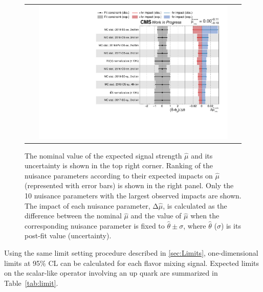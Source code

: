  \begin{figure}[tbh!]
 \begin{center}
 \begin{tabular}{c}
 \includegraphics[width=0.9\textwidth]{figures/Part4/Sensitivity/Impact}
 \end{tabular}
 \caption{The nominal value of the expected signal strength $\hat{\mu}$ and its uncertainty is shown in the top right corner. Ranking of the nuisance parameters according to their expected impacts on $\hat{\mu}$ (represented with error bars) is shown in the right panel. Only the 10 nuisance parameters with the largest observed impacts are shown. The impact of each nuisance parameter, $\mathrm{\Delta}\hat{\mu}$, is calculated as the difference between the nominal $\hat{\mu}$ and the value of $\hat{\mu}$ when the corresponding nuisance parameter is fixed to $\hat{\theta}\pm\sigma$, where $\hat{\theta}$ ($\sigma$) is its post-fit value (uncertainty).}
 \label{fig:Impact_2}
 \end{center}
 \end{figure}
 
Using the same limit setting procedure described in \autoref{sec:Limits}, one-dimensional limits at 95\% \ac{CL} can be calculated for each flavor mixing signal. Expected limits on the scalar-like operator involving an up quark are summarized in Table~\ref{tab:limit}.
 
